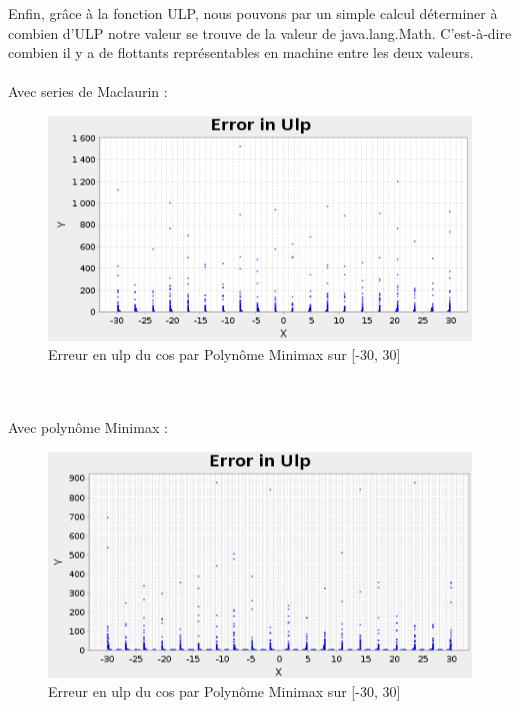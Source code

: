 \documentclass[12pt]{article}
\begin{document}
Enfin, grâce à la fonction ULP, nous pouvons par un simple calcul déterminer à combien d'ULP
notre valeur se trouve de la valeur de java.lang.Math. C'est-à-dire combien il y a de flottants
représentables en machine entre les deux valeurs.\\
\\
\newpage
Avec series de Maclaurin :
\begin{figure}[ht]
    \begin{center}
      \includegraphics[scale=0.29]{ErrorUlpTay.png}
      \caption{Erreur en ulp du cos par Polynôme Minimax sur [-30, 30]}
      \label{Erreur en ulp du cos par série Maclaurin sur [-30, 30] avec 100 000 points}
    \end{center}
\end{figure}

\\ \\
Avec polynôme Minimax :

\begin{figure}[ht]
    \begin{center}
      \includegraphics[scale=0.29]{ErrorUlpMini.png}
      \caption{Erreur en ulp du cos par Polynôme Minimax sur [-30, 30]}
      \label{Erreur en ulp du cos par Polynôme Minimax sur [-30, 30] avec 100 000 points}
    \end{center}
\end{figure}
\end{document}
